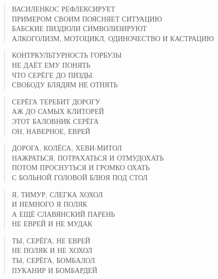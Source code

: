 \poemtitle{***}
\begin{verse}
ВАСИЛЕНКОС РЕФЛЕКСИРУЕТ\\
ПРИМЕРОМ СВОИМ ПОЯСНЯЕТ СИТУАЦИЮ\\
БАБСКИЕ ПИЗДЮЛИ СИМВОЛИЗИРУЮТ\\
АЛКОГОЛИЗМ, МОТОЦИКЛ, ОДИНОЧЕСТВО И КАСТРАЦИЮ
\end{verse}

\poemtitle{***}
\begin{verse}
КОНТРКУЛЬТУРНОСТЬ ГОРБУЗЫ\\
НЕ ДАЁТ ЕМУ ПОНЯТЬ\\
ЧТО СЕРЁГЕ ДО ПИЗДЫ.\\
СВОБОДУ БЛЯДЯМ НЕ ОТНЯТЬ
\end{verse}

\poemtitle{***}
\begin{verse}
СЕРЁГА ТЕРЕБИТ ДОРОГУ\\
АЖ ДО САМЫХ КЛИТОРЕЙ\\
ЭТОТ БАЛОВНИК СЕРЁГА\\
ОН, НАВЕРНОЕ, ЕВРЕЙ
\end{verse}

\poemtitle{***}
\begin{verse}
ДОРОГА, КОЛЁСА, ХЕВИ-МИТОЛ\\
НАЖРАТЬСЯ, ПОТРАХАТЬСЯ И ОТМУДОХАТЬ\\
ПОТОМ ПРОСНУТЬСЯ И ГРОМКО ОХАТЬ\\
С БОЛЬНОЙ ГОЛОВОЙ БЛЮЯ ПОД СТОЛ
\end{verse}

\poemtitle{***}
\begin{verse}
Я, ТИМУР, СЛЕГКА ХОХОЛ\\
И НЕМНОГО Я ПОЛЯК\\
А ЕЩЁ СЛАВЯНСКИЙ ПАРЕНЬ\\
НЕ ЕВРЕЙ И НЕ МУДАК
\end{verse}

\poemtitle{***}
\begin{verse}
ТЫ, СЕРЁГА, НЕ ЕВРЕЙ\\
НЕ ПОЛЯК И НЕ ХОХОЛ\\
ТЫ, СЕРЁГА, БОМБАЛОЛ\\
ПУКАНИР И БОМБАРДЕЙ
\end{verse}


